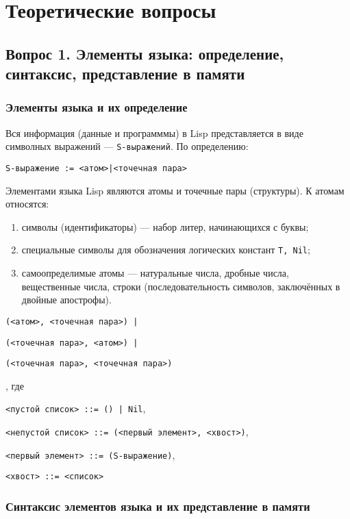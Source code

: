 \chapter{Теоретические вопросы}

\section*{Вопрос 1. Элементы языка: определение, синтаксис, представление в памяти}
\subsection*{Элементы языка и их определение}

Вся информация (данные и программмы) в Lisp представляется в виде символных выражений	 --- \texttt{S-выражений}. По определению:

\texttt{S-выражение := <атом>|<точечная пара>}

Элементами языка Lisp являются атомы и точечные пары (структуры). К атомам относятся:
\begin{enumerate}[label=\arabic*)]
	\item символы (идентификаторы) --- набор литер, начинающихся с буквы;
	\item специальные символы для обозначения логических констант {\texttt{T,~Nil}};
	\item самоопределимые атомы --- натуральные числа, дробные числа, вещественные числа, строки (последовательность символов, заключённых в двойные апострофы).
\end{enumerate}


{\texttt{(<атом>, <точечная пара>) |}}

{\texttt{(<точечная пара>, <атом>) |}}

{\texttt{(<точечная пара>, <точечная пара>)}}


, где

{\texttt{<пустой список> ::= () | Nil}},

{\texttt{<непустой список> ::= (<первый элемент>, <хвост>)}},

{\texttt{<первый элемент> ::= (S-выражение)}},

{\texttt{<хвост> ::= <список>}}

\subsection*{Синтаксис элементов языка и их представление в памяти}

